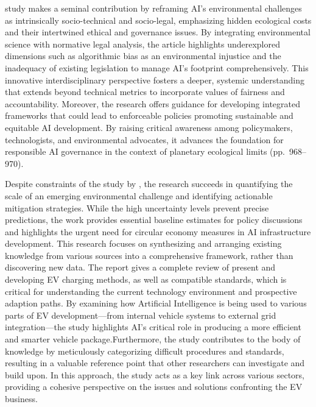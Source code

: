 \documentclass[a4paper, 12pt]{article}
\begin{document}
\par \citet{Zhuk2023} study makes a seminal contribution by reframing AI’s environmental challenges as intrinsically socio-technical and socio-legal, emphasizing hidden ecological costs and their intertwined ethical and governance issues. By integrating environmental science with normative legal analysis, the article highlights underexplored dimensions such as algorithmic bias as an environmental injustice and the inadequacy of existing legislation to manage AI’s footprint comprehensively. This innovative interdisciplinary perspective fosters a deeper, systemic understanding that extends beyond technical metrics to incorporate values of fairness and accountability. Moreover, the research offers guidance for developing integrated frameworks that could lead to enforceable policies promoting sustainable and equitable AI development. By raising critical awareness among policymakers, technologists, and environmental advocates, it advances the foundation for responsible AI governance in the context of planetary ecological limits (pp.~968--970). \hfill \break
\par Despite constraints of the study by \citet{wang_2024_ewaste}, the research succeeds in quantifying the scale of an emerging environmental challenge and identifying actionable mitigation strategies. While the high uncertainty levels prevent precise predictions, the work provides essential baseline estimates for policy discussions and highlights the urgent need for circular economy measures in AI infrastructure development.
This research \citet{M.rauf2024} focuses on synthesizing and arranging existing knowledge from various sources into a comprehensive framework, rather than discovering new data.  The report gives a complete review of present and developing EV charging methods, as well as compatible standards, which is critical for understanding the current technology environment and prospective adaption paths.  By examining how Artificial Intelligence is being used to various parts of EV development—from internal vehicle systems to external grid integration—the study highlights AI's critical role in producing a more efficient and smarter vehicle package.Furthermore, the study contributes to the body of knowledge by meticulously categorizing difficult procedures and standards, resulting in a valuable reference point that other researchers can investigate and build upon.  In this approach, the study acts as a key link across various sectors, providing a cohesive perspective on the issues and solutions confronting the EV business.
\end{document}
